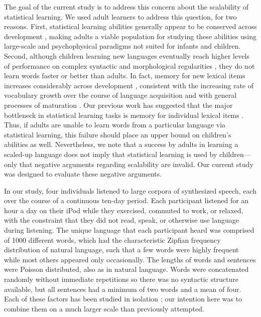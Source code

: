 \documentclass[10pt]{article}
\begin{document}
The goal of the current study is to address this concern about the scalability of statistical learning. We used adult learners to address this question, for two reasons. First, statistical learning abilities generally appear to be conserved across development \cite{saffran1996a,saffran1996b,saffran1997}, making adults a viable population for studying these abilities using large-scale and psychophysical paradigms not suited for infants and children. Second, although children learning new languages eventually reach higher levels of performance on complex syntactic and morphological regularities \cite{johnson1989}, they do not learn words faster or better than adults. In fact, memory for new lexical items increases considerably across development \cite{snow1978,gathercole2004}, consistent with the increasing rate of vocabulary growth over the course of language acquisition \cite{carey1978,bloom2002} and with general processes of maturation \cite{gathercole1999}. Our previous work has suggested that the major bottleneck in statistical learning tasks is memory for individual lexical items \cite{frank2010}. Thus, if adults are unable to learn words from a particular language via statistical learning, this failure should place an upper bound on children's abilities as well. Nevertheless, we note that a success by adults in learning a scaled-up language does not imply that statistical learning is used by children---only that negative arguments regarding scalability are invalid. Our current study was designed to evaluate these negative arguments.

In our study, four individuals listened to large corpora of synthesized speech, each over the course of a continuous ten-day period. Each participant listened for an hour a day on their iPod while they exercised, commuted to work, or relaxed, with the constraint that they did not read, speak, or otherwise use language during listening. The unique language that each participant heard was comprised of 1000 different words, which had the characteristic Zipfian frequency distribution of natural language, such that a few words were highly frequent while most others appeared only occasionally. The lengths of words and sentences were Poisson distributed, also as in natural language. Words were concatenated randomly without immediate repetitions so there was no syntactic structure available, but all sentences had a minimum of two words and a mean of four. Each of these factors has been studied in isolation \cite{frank2010,kurumada2011}; our intention here was to combine them on a much larger scale than previously attempted. 
\end{document}
